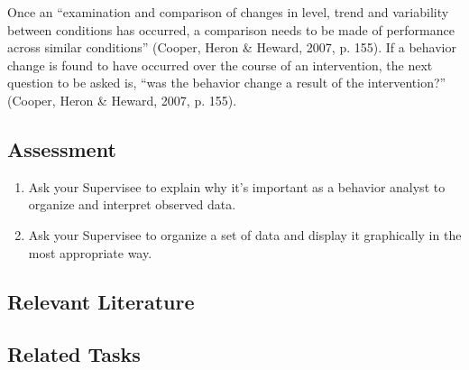 Once an ``examination and comparison of changes in level, trend and variability between conditions has occurred, a comparison needs to be made of performance across similar conditions'' (Cooper, Heron \& Heward, 2007, p. 155). If a behavior change is found to have occurred over the course of an intervention, the next question to be asked is, ``was the behavior change a result of the intervention?'' (Cooper, Heron \& Heward, 2007, p. 155).

\subsection{Assessment}
\begin{enumerate}
\item Ask your Supervisee to explain why it's important as a behavior analyst to organize and interpret observed data. 
\item Ask your Supervisee to organize a set of data and display it graphically in the most appropriate way. 
\end{enumerate}
%
\subsection{Relevant Literature}
\begin{refsection}
\nocite{test,alang2017police,clayton2018black}
\printbibliography[heading=none]
\end{refsection}
%
%
\subsection{Related Tasks}
\fouraTen{}\\
\fouraEleven{}\\
\fourbFour{}\\
\fourbFive{}\\
\fourbSix{}\\
\fourbSeven{}\\
\fourbEight{}\\
\fourbNine{}\\
\fourjFifteen{}\\
%
%
%
%
%
%
%
%
